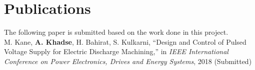 \section{Publications}
The following paper is submitted based on the work done in this project.\\
M. Kane, \textbf{A. Khadse}, H. Bahirat, S. Kulkarni, ``Design and Control of Pulsed Voltage Supply for Electric Discharge Machining,'' in \textit{IEEE International Conference on Power Electronics, Drives and Energy Systems}, 2018 (Submitted)